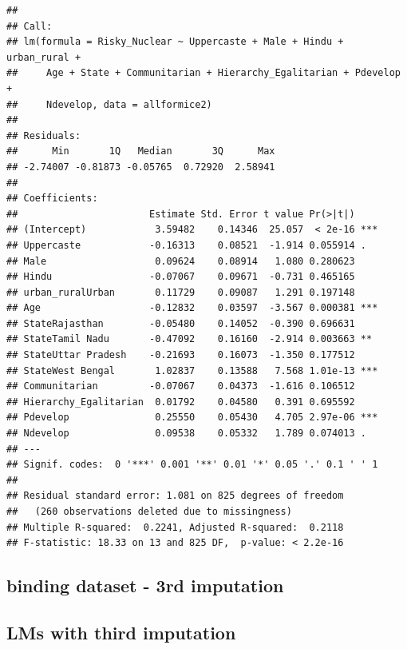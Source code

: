 \documentclass[
]{article}
\begin{document}
\begin{verbatim}
## 
## Call:
## lm(formula = Risky_Nuclear ~ Uppercaste + Male + Hindu + urban_rural + 
##     Age + State + Communitarian + Hierarchy_Egalitarian + Pdevelop + 
##     Ndevelop, data = allformice2)
## 
## Residuals:
##      Min       1Q   Median       3Q      Max 
## -2.74007 -0.81873 -0.05765  0.72920  2.58941 
## 
## Coefficients:
##                       Estimate Std. Error t value Pr(>|t|)    
## (Intercept)            3.59482    0.14346  25.057  < 2e-16 ***
## Uppercaste            -0.16313    0.08521  -1.914 0.055914 .  
## Male                   0.09624    0.08914   1.080 0.280623    
## Hindu                 -0.07067    0.09671  -0.731 0.465165    
## urban_ruralUrban       0.11729    0.09087   1.291 0.197148    
## Age                   -0.12832    0.03597  -3.567 0.000381 ***
## StateRajasthan        -0.05480    0.14052  -0.390 0.696631    
## StateTamil Nadu       -0.47092    0.16160  -2.914 0.003663 ** 
## StateUttar Pradesh    -0.21693    0.16073  -1.350 0.177512    
## StateWest Bengal       1.02837    0.13588   7.568 1.01e-13 ***
## Communitarian         -0.07067    0.04373  -1.616 0.106512    
## Hierarchy_Egalitarian  0.01792    0.04580   0.391 0.695592    
## Pdevelop               0.25550    0.05430   4.705 2.97e-06 ***
## Ndevelop               0.09538    0.05332   1.789 0.074013 .  
## ---
## Signif. codes:  0 '***' 0.001 '**' 0.01 '*' 0.05 '.' 0.1 ' ' 1
## 
## Residual standard error: 1.081 on 825 degrees of freedom
##   (260 observations deleted due to missingness)
## Multiple R-squared:  0.2241, Adjusted R-squared:  0.2118 
## F-statistic: 18.33 on 13 and 825 DF,  p-value: < 2.2e-16
\end{verbatim}

\hypertarget{binding-dataset---3rd-imputation}{%
\subsection{binding dataset - 3rd
imputation}\label{binding-dataset---3rd-imputation}}

\hypertarget{lms-with-third-imputation}{%
\subsection{LMs with third imputation}\label{lms-with-third-imputation}}
\end{document}
